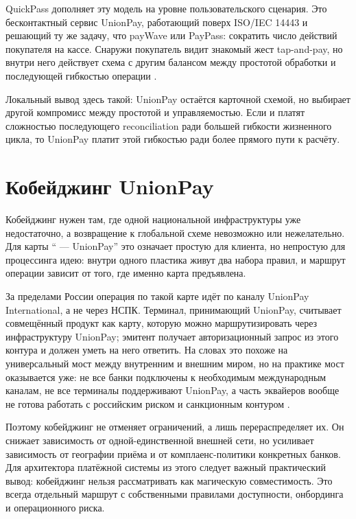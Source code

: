 QuickPass дополняет эту модель на уровне пользовательского сценария. Это бесконтактный сервис UnionPay, работающий
поверх ISO/IEC 14443 и решающий ту же задачу, что payWave или PayPass: сократить число действий покупателя на кассе.
Снаружи покупатель видит знакомый жест tap-and-pay, но внутри него действует схема с другим балансом между простотой
обработки и последующей гибкостью операции .

Локальный вывод здесь такой: UnionPay остаётся карточной схемой,
но выбирает другой компромисс между простотой и управляемостью.
Если  и  платят сложностью
последующего reconciliation ради большей гибкости жизненного цикла,
то UnionPay платит этой гибкостью ради более прямого пути
к расчёту.

\section{Кобейджинг  \texttimes{} UnionPay}
\label{sec:up-mir}

Кобейджинг нужен там, где одной национальной инфраструктуры уже
недостаточно, а возвращение к глобальной схеме невозможно или
нежелательно. Для карты \enquote{ — UnionPay} это
означает простую для клиента, но непростую для процессинга идею:
внутри одного пластика живут два набора правил, и маршрут операции
зависит от того, где именно карта предъявлена.

За пределами России операция по такой карте идёт по каналу
UnionPay International, а не через НСПК. Терминал, принимающий
UnionPay, считывает совмещённый продукт как карту, которую можно
маршрутизировать через инфраструктуру UnionPay; эмитент получает
авторизационный запрос из этого контура и должен уметь на него
ответить. На словах это похоже на универсальный мост между
внутренним и внешним миром, но на практике мост оказывается уже:
не все банки подключены к необходимым международным каналам,
не все терминалы поддерживают UnionPay, а часть эквайеров вообще
не готова работать с российским риском и санкционным
контуром .

Поэтому кобейджинг не отменяет ограничений, а лишь перераспределяет
их. Он снижает зависимость от одной-единственной внешней сети,
но усиливает зависимость от географии приёма и от комплаенс-политики
конкретных банков. Для архитектора платёжной системы из этого
следует важный практический вывод: кобейджинг нельзя рассматривать
как магическую совместимость. Это всегда отдельный маршрут
с собственными правилами доступности, онбординга и операционного
риска.

